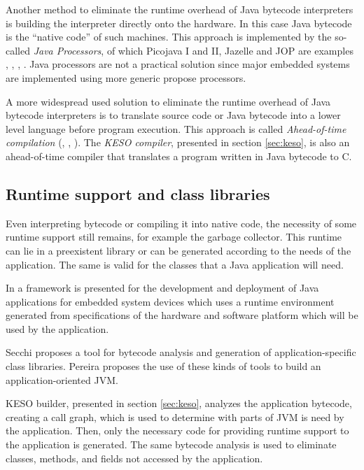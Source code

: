 \documentclass[12pt]{article} %
\begin{document}
Another method to eliminate the runtime overhead of Java bytecode 
interpreters is building the interpreter directly onto the hardware. In this 
case Java bytecode is the ``native code'' of such machines. This approach is
implemented by the so-called \emph{Java Processors}, of which Picojava I and 
II, Jazelle and JOP are examples \cite{picojava1:621089}, 
\cite{picojava2:1288972}, \cite{jazelle}, \cite{jop:1365141}.
Java processors are not a practical solution since major embedded systems are
implemented using more generic propose processors.

A more widespread used solution to eliminate the runtime overhead of Java 
bytecode interpreters is to translate source code or Java bytecode into a
lower level language before program execution. This approach is called
\emph{Ahead-of-time compilation} (\cite{gcj-site}, \cite{sjc}, \cite{1268029}). 
The \emph{KESO compiler}, presented in section \ref{sec:keso}, is also
an ahead-of-time compiler that translates a program written in Java bytecode to
C.

\subsection{Runtime support and class libraries}
	Even interpreting bytecode or compiling it into native code, 
the necessity of some runtime support still remains, for example the garbage 
collector.
This runtime can lie in a preexistent library or can be generated according to
the needs of the application. The same is valid for the classes that a Java
application will need.

In \cite{1620409} a framework is presented for the development and deployment
of Java applications for embedded system devices which uses a runtime 
environment generated from specifications of the hardware and software platform
which will be used by the application.
 
Secchi \cite{Secchi:2004} proposes a tool for bytecode analysis and generation 
of application-specific class libraries. Pereira \cite{Pereira:2007} proposes 
the use of these kinds of tools to build an application-oriented JVM.

	KESO builder, presented in section \ref{sec:keso}, analyzes the application bytecode, creating a call graph, which is used to determine with parts of JVM is need by the application. Then, only the necessary code for providing runtime support to the application is generated. The same bytecode analysis is used to eliminate classes, methods, and fields not accessed by the application.
\end{document}
